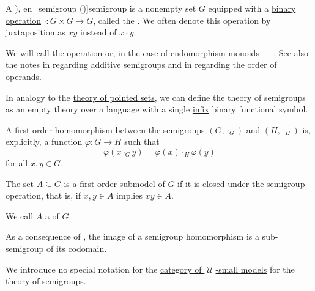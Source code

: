 \begin{definition}\label{def:semigroup}
  A \term[ru=полугруппа (\cite[28]{Ляпин1960Полугруппы}), en=semigroup (\cite[144]{MacLane1998CategoryTheory})]{semigroup} is a nonempty set \( G \) equipped with a \hyperref[def:operation_arity_terminology]{binary} \hyperref[def:operation_on_set]{operation} \( \cdot: G \times G \to G \), called the . We often denote this operation by juxtaposition as \( xy \) instead of \( x \cdot y \).

  We will call the operation  or, in the case of \hyperref[def:endomorphism_monoid]{endomorphism monoids} --- . See also the notes in  regarding additive semigroups and in  regarding the order of operands.

  \begin{thmenum}[series=def:semigroup]
    \mimprovised In analogy to the \hyperref[def:pointed_set/theory]{theory of pointed sets}, we can define the theory of semigroups as an empty theory over a language with a single \hyperref[rem:first_order_formula_conventions/infix]{infix} binary functional symbol.

     A \hyperref[def:first_order_homomorphism]{first-order homomorphism} between the semigroups \( (G, \cdot_{G}) \) and \( (H, \cdot_{H}) \) is, explicitly, a function \( \varphi: G \to H \) such that
    \begin{equation}\label{eq:def:semigroup/homomorphism}
      \varphi(x \cdot_{G} y) = \varphi(x) \cdot_{H} \varphi(y)
    \end{equation}
    for all \( x, y \in G \).

     The set \( A \subseteq G \) is a \hyperref[def:first_order_substructure]{first-order submodel} of \( G \) if it is closed under the semigroup operation, that is, if \( x, y \in A \) implies \( xy \in A \).

    We call \( A \) a  of \( G \).

    As a consequence of , the image of a semigroup homomorphism is a sub-semigroup of its codomain.

    \mimprovised We introduce no special notation for the \hyperref[def:category_of_small_first_order_models]{category of \( \mscrU \)-small models} for the theory of semigroups.


\end{thmenum}
\end{definition}
